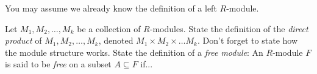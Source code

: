 \documentclass{exam}
\begin{document}
\begin{center}
\end{center}

\vspace*{1em}
You may assume we already know the definition of a left $R$-module.
\begin{questions}
    \question[2]
        Let $M_1, M_2, \dots, M_k$ be a collection of $R$-modules. State the definition of the \textit{direct product} of $M_1, 
        M_2, \dots, M_k$, denoted $M_1\times M_2 \times\dots M_k$. Don't forget to state how the module structure works.
        \vspace*{10cm}
    \question[3]
        State the definition of a \textit{free module}: An $R$-module $F$ is said to be \textit{free} on a subset $A\subseteq F$ if...
\end{questions}
\end{document}
